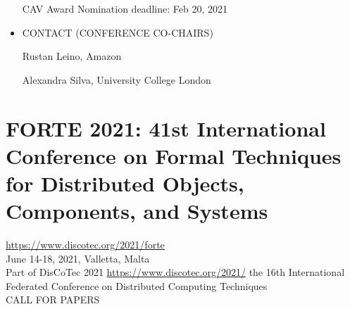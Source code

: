 \documentclass{article}
\begin{document}
\begin{itemize}
CAV Award Nomination deadline: Feb 20, 2021 
 
\item  CONTACT (CONFERENCE CO-CHAIRS) 
 
  Rustan Leino, Amazon  
 
  Alexandra Silva, University College London  
 
\end{itemize}\section{FORTE 2021: 41st International Conference on Formal Techniques for Distributed Objects, Components, and Systems}\label{FORTE2021}  \href{https://www.discotec.org/2021/forte}{https://www.discotec.org/2021/forte}\\ 
  June 14-18, 2021, Valletta, Malta\\ 
  Part of DisCoTec 2021 \href{https://www.discotec.org/2021/}{https://www.discotec.org/2021/} the 16th International Federated Conference on Distributed Computing Techniques\\ 
CALL FOR PAPERS 
\end{document}

